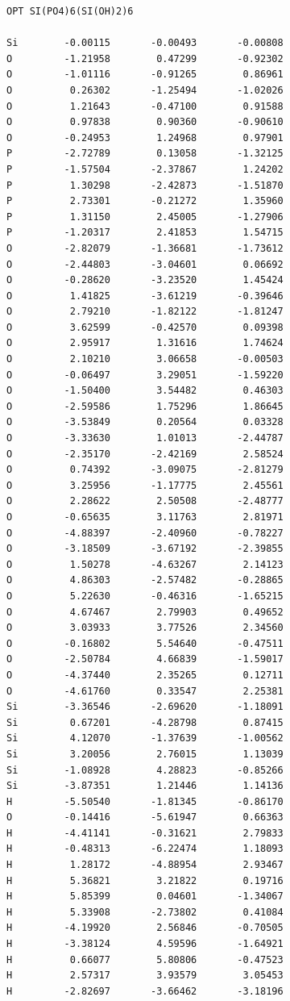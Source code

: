 \documentclass[
  printed, %
  table,   %
  lof,     %
  lot,     %
  oneside,
]{fithesis3}
\begin{document}
\begin{lstlisting}[frame=single, caption={\ce{(Si(PO4)6(Si(OH)2)6)^{2-}}},label=DescriptiveLabel]
OPT SI(PO4)6(SI(OH)2)6

Si        -0.00115       -0.00493       -0.00808
O         -1.21958        0.47299       -0.92302
O         -1.01116       -0.91265        0.86961
O          0.26302       -1.25494       -1.02026
O          1.21643       -0.47100        0.91588
O          0.97838        0.90360       -0.90610
O         -0.24953        1.24968        0.97901
P         -2.72789        0.13058       -1.32125
P         -1.57504       -2.37867        1.24202
P          1.30298       -2.42873       -1.51870
P          2.73301       -0.21272        1.35960
P          1.31150        2.45005       -1.27906
P         -1.20317        2.41853        1.54715
O         -2.82079       -1.36681       -1.73612
O         -2.44803       -3.04601        0.06692
O         -0.28620       -3.23520        1.45424
O          1.41825       -3.61219       -0.39646
O          2.79210       -1.82122       -1.81247
O          3.62599       -0.42570        0.09398
O          2.95917        1.31616        1.74624
O          2.10210        3.06658       -0.00503
O         -0.06497        3.29051       -1.59220
O         -1.50400        3.54482        0.46303
O         -2.59586        1.75296        1.86645
O         -3.53849        0.20564        0.03328
O         -3.33630        1.01013       -2.44787
O         -2.35170       -2.42169        2.58524
O          0.74392       -3.09075       -2.81279
O          3.25956       -1.17775        2.45561
O          2.28622        2.50508       -2.48777
O         -0.65635        3.11763        2.81971
O         -4.88397       -2.40960       -0.78227
O         -3.18509       -3.67192       -2.39855
O          1.50278       -4.63267        2.14123
O          4.86303       -2.57482       -0.28865
O          5.22630       -0.46316       -1.65215
O          4.67467        2.79903        0.49652
O          3.03933        3.77526        2.34560
O         -0.16802        5.54640       -0.47511
O         -2.50784        4.66839       -1.59017
O         -4.37440        2.35265        0.12711
O         -4.61760        0.33547        2.25381
Si        -3.36546       -2.69620       -1.18091
Si         0.67201       -4.28798        0.87415
Si         4.12070       -1.37639       -1.00562
Si         3.20056        2.76015        1.13039
Si        -1.08928        4.28823       -0.85266
Si        -3.87351        1.21446        1.14136
H         -5.50540       -1.81345       -0.86170
O         -0.14416       -5.61947        0.66363
H         -4.41141       -0.31621        2.79833
H         -0.48313       -6.22474        1.18093
H          1.28172       -4.88954        2.93467
H          5.36821        3.21822        0.19716
H          5.85399        0.04601       -1.34067
H          5.33908       -2.73802        0.41084
H         -4.19920        2.56846       -0.70505
H         -3.38124        4.59596       -1.64921
H          0.66077        5.80806       -0.47523
H          2.57317        3.93579        3.05453
H         -2.82697       -3.66462       -3.18196
 \end{lstlisting}
\end{document}

